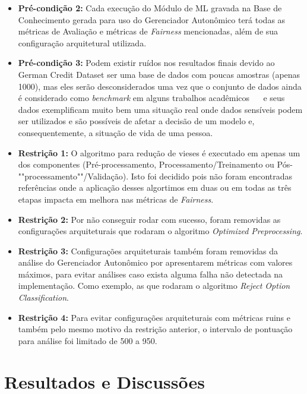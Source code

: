 \documentclass[Portugues,Final]{ic-tese-v3}
\begin{document}
\begin{itemize}
\item \textbf{Pré-condição 2:} Cada execução do Módulo de ML gravada na Base de Conhecimento gerada para uso do Gerenciador Autonômico terá todas as métricas de Avaliação e métricas de \textit{Fairness} mencionadas, além de sua configuração arquitetural utilizada.

\item \textbf{Pré-condição 3:} Podem existir ruídos nos resultados finais devido ao German Credit Dataset ser uma base de dados com poucas amostras (apenas 1000), mas eles serão desconsiderados uma vez que o conjunto de dados ainda é considerado como \textit{benchmark} em alguns trabalhos acadêmicos \cite{Kamiran_2011}~\cite{Feldman_2015}~\cite{Celis_2019} e seus dados exemplificam muito bem uma situação real onde dados sensíveis podem ser utilizados e são possíveis de afetar a decisão de um modelo e, consequentemente, a situação de vida de uma pessoa.

\item \textbf{Restrição 1:} O algoritmo para redução de vieses é executado em apenas um dos componentes (Pré-processamento, Processamento/Treinamento ou Pós-""processamento""/Validação). Isto foi decidido pois não foram encontradas referências onde a aplicação desses algortimos em duas ou em todas as três etapas impacta em melhora nas métricas de \textit{Fairness}.

\item \textbf{Restrição 2:} Por não conseguir rodar com sucesso, foram removidas as configurações arquiteturais que rodaram o algoritmo \textit{Optimized Preprocessing}.

\item \textbf{Restrição 3:} Configurações arquiteturais também foram removidas da análise do Gerenciador Autonômico por apresentarem métricas com valores máximos, para evitar análises caso exista alguma falha não detectada na implementação. Como exemplo, as que rodaram o algoritmo \textit{Reject Option Classification}.

\item \textbf{Restrição 4:} Para evitar configurações arquiteturais com métricas ruins e também pelo mesmo motivo da restrição anterior, o intervalo de pontuação para análise foi limitado de 500 a 950.
\end{itemize}

\section{Resultados e Discussões}
\end{document}
